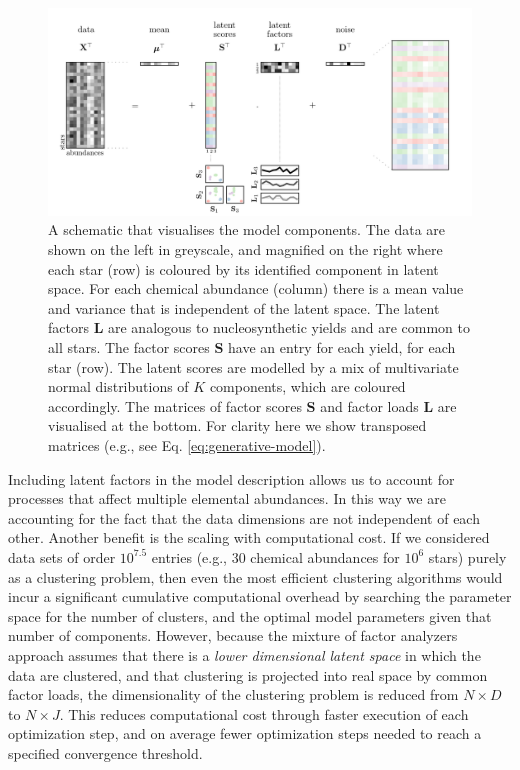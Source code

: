 \documentclass[twocolumn]{aastex62}
\newcommand{\factorloads}{\textbf{L}}
\newcommand{\factorscores}{\textbf{S}}
\newcommand{\NumComponents}{K}
\begin{document}
\begin{figure}
	\includegraphics[width=\textwidth]{experiments/schematic.png}
	\caption{A schematic that visualises the model components.
			 The data are shown on the left in greyscale, and magnified on the
			 right where each star (row) is coloured by its identified
			 component in latent space.
			 For each chemical abundance (column) there is a mean value and
			 variance that is independent of the latent space.
			 The latent factors $\factorloads$ are analogous to nucleosynthetic
			 yields and are common to all stars. The factor scores $\factorscores$
			 have an entry for each yield, for each star (row). The latent scores are modelled
			 by a mix of multivariate normal distributions of $\NumComponents$
			 components, which are coloured accordingly. The matrices of factor 
			 scores $\factorscores$ and factor loads $\factorloads$ are 
			 visualised at the bottom. For clarity here we show transposed
			 matrices (e.g., see Eq. \ref{eq:generative-model}).}
	\label{fig:schematic}
\end{figure}


Including latent factors in the model description allows us to account for 
processes that affect multiple elemental abundances. In this way we are 
accounting for the fact that the data dimensions are not independent of
each other. Another benefit is the scaling with computational cost. If we 
considered data sets of order $10^{7.5}$
entries (e.g., 30 chemical abundances for $10^6$ stars) purely as a
clustering problem, then even the most efficient clustering
algorithms would incur a significant cumulative computational 
overhead by searching the parameter space for the number of
clusters, and the optimal model parameters given that number
of components. However, because the mixture of factor analyzers
approach assumes that there is a \emph{lower dimensional latent 
space} in which the data are clustered, and that clustering is 
projected into real space by common factor loads, the 
dimensionality of the clustering problem is reduced from 
$N \times D$ to $N \times J$. This reduces computational cost through
faster execution of each optimization step, and on average fewer optimization steps
needed to reach a specified convergence threshold.
\end{document}

